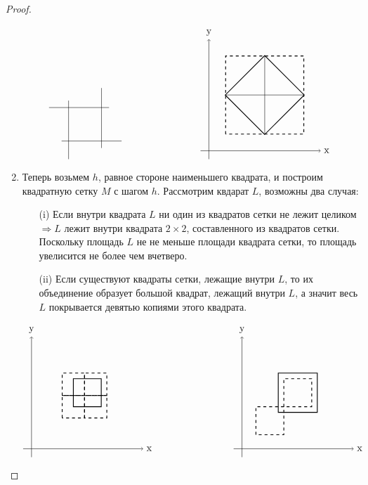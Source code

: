 \begin{proof}
\begin{enumerate}
\[\begin{tikzpicture}
            \draw[-] (0.7, 2.6) -- (2.85, 2.6);
            \draw[-] (1.15, 1.4) -- (3.3, 1.4);
            \draw[-] (1.4, 0.75) -- (1.4, 2.85);
            \draw[-] (2.58, 1.15) -- (2.58, 3.3);
        \end{tikzpicture}
        \tab[80pt]
        \begin{tikzpicture}
            \draw[->] (-0.3, 0) -- (4, 0) node[right] {x};
            \draw[->] (0, -0.3) -- (0, 4) node[above] {y};
            \draw[thick, rotate around={45:(2,2)}] (1, 1) rectangle (3, 3);
            \draw[thick, dashed] (0.6, 0.6) rectangle (3.4, 3.4);
            \draw[-] (2, 0.6) -- (2, 3.4);
            \draw[-] (0.6, 2) -- (3.4, 2);
        \end{tikzpicture}
        \]
        \item Теперь возьмем $h$, равное стороне наименьшего квадрата, и построим квадратную сетку $M$ с шагом $h$. Рассмотрим квдарат $L$, возможны два случая:
        \begin{itemize}
            \item[(i)] Если внутри квадрата $L$ ни один из квадратов сетки не лежит целиком $\Rightarrow L$ лежит внутри квадрата $2\times 2$, составленного из квадратов сетки. Поскольку площадь $L$ не не меньше площади квадрата сетки, то площадь увелисится не более чем вчетверо.
            \item[(ii)] Если существуют квадраты сетки, лежащие внутри $L$, то их объединение образует большой квадрат, лежащий внутри $L$, а значит весь $L$ покрывается девятью копиями этого квадрата.
        \end{itemize}
        \[
        \begin{tikzpicture}
            \draw[->] (-0.3, 0) -- (4, 0) node[right] {x};
            \draw[->] (0, -0.3) -- (0, 4) node[above] {y};
            \draw[thick] (1.5, 1.5) rectangle (2.5, 2.5);
            \draw[thick, dashed] (1.1, 1.1) rectangle (1.9, 1.9);
            \draw[thick, dashed] (1.1, 1.9) rectangle (1.9, 2.7);
            \draw[thick, dashed] (1.9, 1.1) rectangle (2.7, 1.9);
            \draw[thick, dashed] (1.9, 1.9) rectangle (2.7, 2.7);
        \end{tikzpicture}
        \tab[80pt]
        \begin{tikzpicture}
            \draw[->] (-0.3, 0) -- (4, 0) node[right] {x};
            \draw[->] (0, -0.3) -- (0, 4) node[above] {y};
            \draw[thick, dashed] (1.5, 1.5) rectangle (2.5, 2.5);
            \draw[thick] (1.3, 1.3) rectangle (2.7, 2.7);
            \draw[thick, dashed] (0.5, 0.5) rectangle (1.5, 1.5);

\end{tikzpicture}\]
\end{enumerate}
\end{proof}
